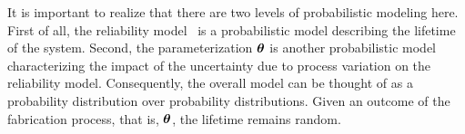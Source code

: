 \begin{remark} 
It is important to realize that there are two levels of probabilistic modeling here.
First of all, the reliability model \perse\ is a probabilistic model describing the lifetime of the system.
Second, the parameterization $\bm{\theta}$ is another probabilistic model characterizing the impact of the uncertainty due to process variation on the reliability model.
Consequently, the overall model can be thought of as a probability distribution over probability distributions.
Given an outcome of the fabrication process, that is, $\bm{\theta}$, the lifetime remains random.
\end{remark}

